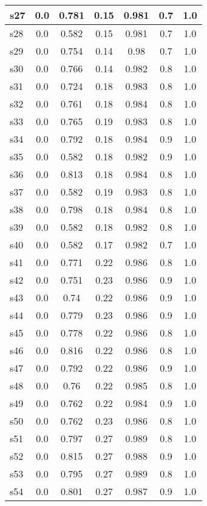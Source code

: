 \documentclass{article}
\begin{document}
\begin{tabular}{|l|c|c|c|c|c|c|}
\hline
s27 &0.0 & 0.781 & 0.15 & 0.981 & 0.7 & 1.0\\
\hline
s28 &0.0 & 0.582 & 0.15 & 0.981 & 0.7 & 1.0\\
\hline
s29 &0.0 & 0.754 & 0.14 & 0.98 & 0.7 & 1.0\\
\hline
s30 &0.0 & 0.766 & 0.14 & 0.982 & 0.8 & 1.0\\
\hline
s31 &0.0 & 0.724 & 0.18 & 0.983 & 0.8 & 1.0\\
\hline
s32 &0.0 & 0.761 & 0.18 & 0.984 & 0.8 & 1.0\\
\hline
s33 &0.0 & 0.765 & 0.19 & 0.983 & 0.8 & 1.0\\
\hline
s34 &0.0 & 0.792 & 0.18 & 0.984 & 0.9 & 1.0\\
\hline
s35 &0.0 & 0.582 & 0.18 & 0.982 & 0.9 & 1.0\\
\hline
s36 &0.0 & 0.813 & 0.18 & 0.984 & 0.8 & 1.0\\
\hline
s37 &0.0 & 0.582 & 0.19 & 0.983 & 0.8 & 1.0\\
\hline
s38 &0.0 & 0.798 & 0.18 & 0.984 & 0.8 & 1.0\\
\hline
s39 &0.0 & 0.582 & 0.18 & 0.982 & 0.8 & 1.0\\
\hline
s40 &0.0 & 0.582 & 0.17 & 0.982 & 0.7 & 1.0\\
\hline
s41 &0.0 & 0.771 & 0.22 & 0.986 & 0.8 & 1.0\\
\hline
s42 &0.0 & 0.751 & 0.23 & 0.986 & 0.9 & 1.0\\
\hline
s43 &0.0 & 0.74 & 0.22 & 0.986 & 0.9 & 1.0\\
\hline
s44 &0.0 & 0.779 & 0.23 & 0.986 & 0.9 & 1.0\\
\hline
s45 &0.0 & 0.778 & 0.22 & 0.986 & 0.8 & 1.0\\
\hline
s46 &0.0 & 0.816 & 0.22 & 0.986 & 0.8 & 1.0\\
\hline
s47 &0.0 & 0.792 & 0.22 & 0.986 & 0.9 & 1.0\\
\hline
s48 &0.0 & 0.76 & 0.22 & 0.985 & 0.8 & 1.0\\
\hline
s49 &0.0 & 0.762 & 0.22 & 0.984 & 0.9 & 1.0\\
\hline
s50 &0.0 & 0.762 & 0.23 & 0.986 & 0.8 & 1.0\\
\hline
s51 &0.0 & 0.797 & 0.27 & 0.989 & 0.8 & 1.0\\
\hline
s52 &0.0 & 0.815 & 0.27 & 0.988 & 0.9 & 1.0\\
\hline
s53 &0.0 & 0.795 & 0.27 & 0.989 & 0.8 & 1.0\\
\hline
s54 &0.0 & 0.801 & 0.27 & 0.987 & 0.9 & 1.0\\

\end{tabular}
\end{document}
